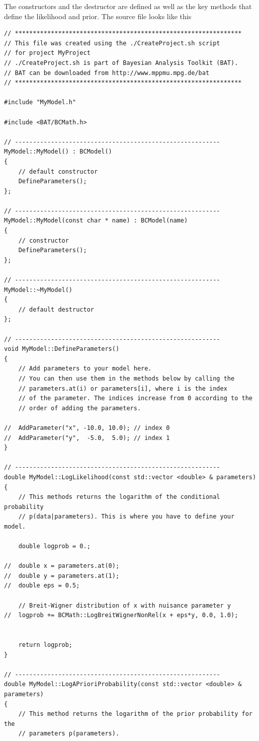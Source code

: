 \documentclass[11pt, a4paper]{article}
\begin{document}
The constructors and the destructor are defined as well as the key
methods that define the likelihood and prior. The source file looks
like this
%
\begin{verbatim}
// ***************************************************************
// This file was created using the ./CreateProject.sh script
// for project MyProject
// ./CreateProject.sh is part of Bayesian Analysis Toolkit (BAT).
// BAT can be downloaded from http://www.mppmu.mpg.de/bat
// ***************************************************************

#include "MyModel.h"

#include <BAT/BCMath.h>

// ---------------------------------------------------------
MyModel::MyModel() : BCModel()
{  
	// default constructor
	DefineParameters();
};

// ---------------------------------------------------------
MyModel::MyModel(const char * name) : BCModel(name)
{ 
	// constructor
	DefineParameters();
};

// ---------------------------------------------------------
MyModel::~MyModel()
{
	// default destructor
};

// ---------------------------------------------------------
void MyModel::DefineParameters()
{
	// Add parameters to your model here.
	// You can then use them in the methods below by calling the
	// parameters.at(i) or parameters[i], where i is the index
	// of the parameter. The indices increase from 0 according to the
	// order of adding the parameters.

//	AddParameter("x", -10.0, 10.0); // index 0
//	AddParameter("y",  -5.0,  5.0); // index 1
}

// ---------------------------------------------------------
double MyModel::LogLikelihood(const std::vector <double> & parameters)
{
	// This methods returns the logarithm of the conditional probability
	// p(data|parameters). This is where you have to define your model.

	double logprob = 0.;

//	double x = parameters.at(0);
//	double y = parameters.at(1);
//	double eps = 0.5;

	// Breit-Wigner distribution of x with nuisance parameter y
//	logprob += BCMath::LogBreitWignerNonRel(x + eps*y, 0.0, 1.0);


	return logprob;
}

// ---------------------------------------------------------
double MyModel::LogAPrioriProbability(const std::vector <double> & parameters)
{
	// This method returns the logarithm of the prior probability for the
	// parameters p(parameters).


\end{verbatim}
\end{document}
